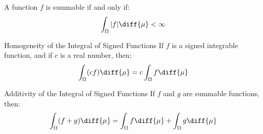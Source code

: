     \begin{theorem}
        A function $f$ is summable if and only if:
        \begin{equation}
            \int_{\Omega}|f|\diff{\mu}<\infty
        \end{equation}
    \end{theorem}
    \begin{ltheorem}{Homogeneity of the Integral of Signed Functions}
        If $f$ is a signed integrable function, and if $c$ is a
        real number, then:
        \begin{equation}
            \int_{\Omega}(cf)\diff{\mu}=
            c\int_{\Omega}f\diff{\mu}
        \end{equation}
    \end{ltheorem}
    \begin{ltheorem}{Additivity of the Integral of Signed Functions}
        If $f$ and $g$ are summable functions, then:
        \begin{equation}
            \int_{\Omega}(f+g)\diff{\mu}
            =\int_{\Omega}f\diff{\mu}+\int_{\Omega}g\diff{\mu}
        \end{equation}
    \end{ltheorem}
